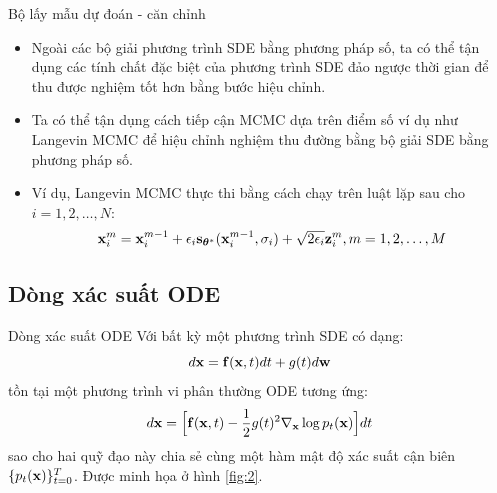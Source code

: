 \documentclass[10pt]{beamer}
\theoremstyle{remark}
\numberwithin{algocf}{section}
\numberwithin{equation}{section}
\numberwithin{dl}{section}
\numberwithin{figure}{section}
\begin{document}
\begin{frame}{Bộ lấy mẫu dự đoán - căn chỉnh}
	\begin{itemize}
		\item Ngoài các bộ giải phương trình SDE bằng phương pháp số, ta có thể tận dụng các tính chất đặc biệt của phương trình SDE đảo ngược thời gian để thu được nghiệm tốt hơn bằng bước hiệu chỉnh.
		\item Ta có thể tận dụng cách tiếp cận MCMC dựa trên điểm số ví dụ như Langevin MCMC để hiệu chỉnh nghiệm thu đường bằng bộ giải SDE bằng phương pháp số.
		\item Ví dụ, Langevin MCMC thực thi bằng cách chạy trên luật lặp sau cho $i=1,2,\dots, N$:
		\begin{equation*}
			\bold{x}_i^m = \bold{x}_i^{m-1} + \epsilon_i \bold{s}_{\boldsymbol{\theta}^{\ast}} (\bold{x}_i^{m-1}, \sigma_i) + \sqrt{2 \epsilon_i} \bold{z}_i^m, m = 1, 2, \dots, M
		\end{equation*}
	\end{itemize}
\end{frame}

\subsection{Dòng xác suất ODE}

\begin{frame}{Dòng xác suất ODE}
	Với bất kỳ một phương trình SDE có dạng:
	\begin{equation*}
		d \bold{x} = \bold{f} (\bold{x}, t) dt + g(t) d \bold{w}
	\end{equation*}
	tồn tại một phương trình vi phân thường ODE tương ứng:
	\begin{equation} \label{eq:13}
		d \bold{x} = \Big \lbrack \bold{f}(\bold{x}, t) - \dfrac{1}{2}g(t)^2 \nabla_{\bold{x}} \log p_t (\bold{x}) \Big \rbrack dt
	\end{equation}
	sao cho hai quỹ đạo này chia sẻ cùng một hàm mật độ xác suất cận biên $\lbrace p_t (\bold{x}) \rbrace_{t=0}^T$. Được minh họa ở hình \ref{fig:2}.
\end{frame}
\end{document}

